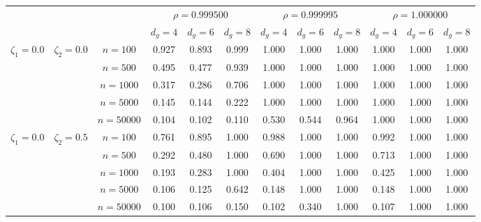 \documentclass[hidelinks, 11 pt, a4paper, pdflatex]{article}
\begin{document}
{\begin{landscape}
\begin{table}[h]
\begin{center}
\begin{tabular}[t]{cccccccccccc}
      \hline
      \hline

      \multicolumn{3}{c}{} & \multicolumn{3}{c}{$\rho=0.999500$} & \multicolumn{3}{c}{$\rho=0.999995$} & \multicolumn{3}{c}{$\rho=1.000000$}  \\
      \multicolumn{3}{c}{} & \multicolumn{1}{c}{$d_g=4$} & \multicolumn{1}{c}{$d_g=6$} & \multicolumn{1}{c}{$d_g=8$} & \multicolumn{1}{c}{$d_g=4$} & \multicolumn{1}{c}{$d_g=6$} &
               \multicolumn{1}{c}{$d_g=8$} & \multicolumn{1}{c}{$d_g=4$} & \multicolumn{1}{c}{$d_g=6$} & \multicolumn{1}{c}{$d_g=8$}   \\

      \hline
      \hline

      $\zeta_1=0.0$ & $\zeta_2=0.0$ & $n=100$   & 0.927 & 0.893 & 0.999 & 1.000 & 1.000 & 1.000 & 1.000 & 1.000 & 1.000  \\ [0.3cm]
                    &               & $n=500$   & 0.495 & 0.477 & 0.939 & 1.000 & 1.000 & 1.000 & 1.000 & 1.000 & 1.000  \\ [0.3cm]
                    &               & $n=1000$  & 0.317 & 0.286 & 0.706 & 1.000 & 1.000 & 1.000 & 1.000 & 1.000 & 1.000  \\ [0.3cm]
                    &               & $n=5000$  & 0.145 & 0.144 & 0.222 & 1.000 & 1.000 & 1.000 & 1.000 & 1.000 & 1.000  \\ [0.3cm]
                    &               & $n=50000$ & 0.104 & 0.102 & 0.110 & 0.530 & 0.544 & 0.964 & 1.000 & 1.000 & 1.000  \\ [0.3cm]
									
      \hline
									
      $\zeta_1=0.0$ & $\zeta_2=0.5$ & $n=100$   & 0.761 & 0.895 & 1.000 & 0.988 & 1.000 & 1.000 & 0.992 & 1.000 & 1.000  \\ [0.3cm]
                    &               & $n=500$   & 0.292 & 0.480 & 1.000 & 0.690 & 1.000 & 1.000 & 0.713 & 1.000 & 1.000  \\ [0.3cm]
                    &               & $n=1000$  & 0.193 & 0.283 & 1.000 & 0.404 & 1.000 & 1.000 & 0.425 & 1.000 & 1.000  \\ [0.3cm]
                    &               & $n=5000$  & 0.106 & 0.125 & 0.642 & 0.148 & 1.000 & 1.000 & 0.148 & 1.000 & 1.000  \\ [0.3cm]
                    &               & $n=50000$ & 0.100 & 0.106 & 0.150 & 0.102 & 0.340 & 1.000 & 0.107 & 1.000 & 1.000  \\ [0.3cm]
									

\end{tabular}
\end{center}
\end{table}
\end{landscape}}
\end{document}
